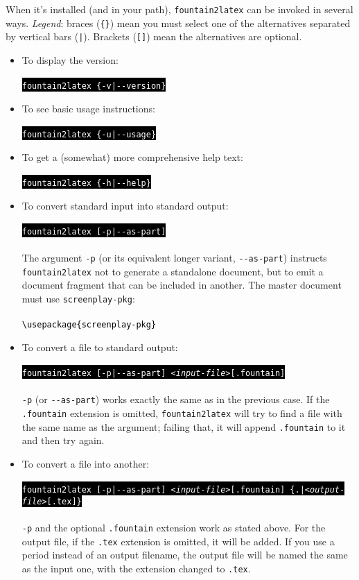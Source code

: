 \documentclass[11pt]{article}
\newcommand{\cmdline}[1]{    \hspace{0.5in}\colorbox{Black}{\textcolor{White}{\texttt{#1}}}}
\begin{document}
When it's installed (and in your path), \texttt{fountain2latex} can be
invoked in several ways. \emph{Legend}: braces (\texttt{\{\}}) mean you
must select one of the alternatives separated by vertical bars (\texttt{|}).
Brackets (\texttt{[]}) mean the alternatives are optional.
\begin{itemize}
  \item{To display the version:\\ \\
    \cmdline{fountain2latex \{-v|-{}-version\}}}\\
  \item{To see basic usage instructions:\\ \\
    \cmdline{fountain2latex \{-u|-{}-usage\}}}\\
  \item{To get a (somewhat) more comprehensive help text:\\ \\
    \cmdline{fountain2latex \{-h|-{}-help\}}}\\
  \item{To convert standard input into standard output:\\ \\
    \cmdline{fountain2latex [-p|-{}-as-part]}\\ \\
    The argument \texttt{-p} (or its equivalent longer variant, \texttt{-{}-as-part})
    instructs \texttt{fountain2latex} not to generate a standalone document,
    but to emit a document fragment that can be included in another. The master
    document must use \texttt{screenplay-pkg}:\\ \\
    \colorbox{Parchment}{\textcolor{Black}{\texttt{\textbackslash{}usepackage\{screenplay-pkg\}}}}}\\
  \item{To convert a file to standard output:\\ \\
    \cmdline{fountain2latex [-p|-{}-as-part] \emph{<input-file>}[.fountain]}\\ \\
    \texttt{-p} (or \texttt{-{}-as-part}) works exactly the same as in the previous
    case. If the \texttt{.fountain} extension is omitted, \texttt{fountain2latex}
    will try to find a file with the same name as the argument; failing that, it
    will append \texttt{.fountain} to it and then try again.}
  \item{To convert a file into another:\\ \\
    \cmdline{\small{fountain2latex [-p|-{}-as-part] \emph{<input-file>}[.fountain] \{.|\emph{<output-file>}[.tex]\}}}\\ \\
    \texttt{-p} and the optional \texttt{.fountain} extension work as
    stated above. For the output file, if the \texttt{.tex} extension
    is omitted, it will be added. If you use a period instead of an
    output filename, the output file will be named the same as the
    input one, with the extension changed to \texttt{.tex}.}
\end{itemize}
\end{document}
